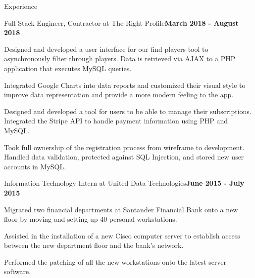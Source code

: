 \documentclass{resume} %
\begin{document}
\begin{rSection}{Experience}


\begin{rSubsection}{Full Stack Engineer, Contractor at The Right Profile}{\bf March 2018 - August 2018}{}{}

\item Designed and developed a user interface for our find players tool to asynchronously filter through players. Data is retrieved via AJAX to a PHP application that executes MySQL queries.
\item Integrated Google Charts into data reports and customized their visual style to improve data representation and provide a more modern feeling to the app.
\item Designed and developed a tool for users to be able to manage their subscriptions. Integrated the Stripe API to handle payment information using PHP and MySQL.
\item Took full ownership of the registration process from wireframe to development. Handled data validation, protected against SQL Injection, and stored new user accounts in MySQL.

\end{rSubsection}


\begin{rSubsection}{Information Technology Intern at United Data Technologies}{\bf June 2015 - July 2015}{}{}

\item Migrated two financial departments at Santander Financial Bank onto a new floor by moving and setting up 40 personal workstations. 
\item Assisted in the installation of a new Cisco computer server to establish access between the new department floor and the bank’s network.
\item Performed the patching of all the new workstations onto the latest server software.

\end{rSubsection}


\end{rSection}

\end{document}
